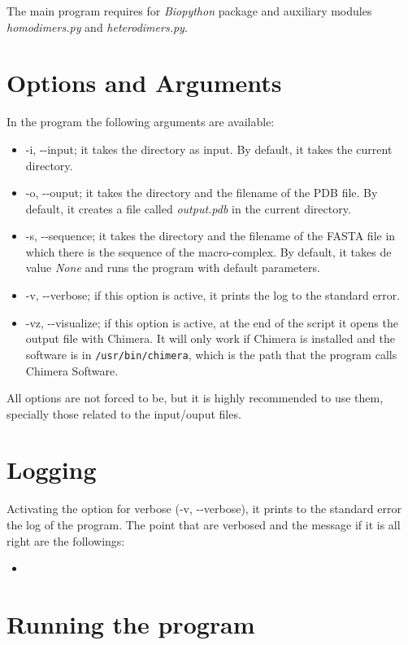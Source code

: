 \documentclass[a4paper,12pt]{report}
\begin{document}
The main program requires for \textit{Biopython} package and auxiliary modules \textit{homodimers.py} and \textit{heterodimers.py}.

\section{Options and Arguments}

In the program the following arguments are available:

\begin{itemize}
 \item -i, -{}-input; it takes the directory as input. By default, it takes the current directory.
 \item -o, -{}-ouput; it takes the directory and the filename of the PDB file. By default, it creates a file called \textit{output.pdb} in the current directory.
 \item -s, -{}-sequence; it takes the directory and the filename of the FASTA file in which there is the sequence of the macro-complex. By default, it takes de value \textit{None} and runs the program with default parameters.
 \item -v, -{}-verbose; if this option is active, it prints the log to the standard error. 
 \item -vz, -{}-visualize; if this option is active, at the end of the script it opens the output file with Chimera. It will only work if Chimera is installed and the software is in \texttt{/usr/bin/chimera}, which is the path that the program calls Chimera Software.
\end{itemize}

All options are not forced to be, but it is highly recommended to use them, specially those related to the input/ouput files.

\section{Logging}

Activating the option for verbose (-v, -{}-verbose), it prints to the standard error the log of the program. The point that are verbosed and the message if it is all right are the followings:

\begin{itemize}
 \item 
\end{itemize}

\section{Running the program}
\end{document}

